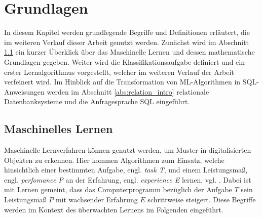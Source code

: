 \chapter{Grundlagen}
\label{kap:fund}
In diesem Kapitel werden grundlegende Begriffe und Definitionen erläutert, die im weiteren Verlauf dieser Arbeit genutzt werden. Zunächst wird im Abschnitt \ref{abs:mathe_intro} ein kurzer Überklick über das Maschinelle Lernen und dessen mathematische Grundlagen gegeben. Weiter wird die Klassifikationsaufgabe definiert und ein erster Lernalgorithmus vorgestellt, welcher im weiteren Verlauf der Arbeit verfeinert wird. Im Hinblick auf die Transformation von ML-Algorithmen in SQL-Anweisungen werden im Abschnitt \ref{abs:relation_intro} relationale Datenbanksysteme und die Anfragesprache SQL eingeführt.
\section{Maschinelles Lernen}
\label{abs:mathe_intro}
Maschinelle Lernverfahren können genutzt werden, um Muster in digitalisierten Objekten zu erkennen. Hier kommen Algorithmen zum Einsatz, welche hinsichtlich einer bestimmten Aufgabe, engl. \textit{task T}, und einem Leistungsmaß, engl. \textit{perfomance P} an der Erfahrung, engl. \textit{experience E} lernen, vgl. \cite{mitchell1997machine}. Dabei ist mit Lernen gemeint, dass das Computerprogramm bezüglich der Aufgabe $T$ sein
Leistungsmaß $P$ mit wachsender Erfahrung $E$ schrittweise steigert. Diese Begriffe werden im Kontext des überwachten Lernens im Folgenden eingeführt.

